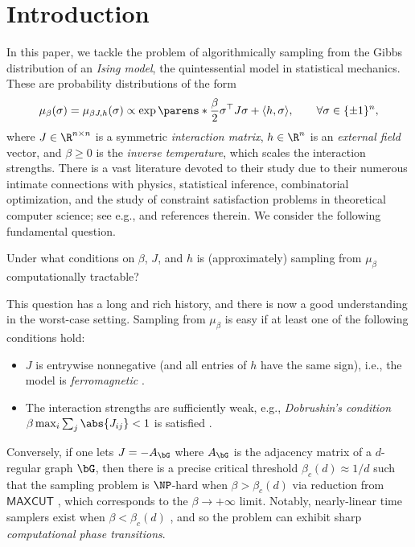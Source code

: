\documentclass[11pt,letterpaper]{article}
\begin{document}
\thispagestyle{empty}
\setcounter{page}{0}

\newpage




\section{Introduction}
In this paper, we tackle the problem of algorithmically sampling from the Gibbs distribution of an \emph{Ising model}, the quintessential model in statistical mechanics. These are probability distributions of the form
\begin{align*}
    \mu_{\beta}(\sigma) = \mu_{\beta J,h}(\sigma) \propto \exp\parens*{\frac{\beta}{2}\sigma^{\top} J \sigma + \langle h,\sigma\rangle}, \qquad \forall \sigma \in \{\pm1\}^{n},
\end{align*}
where $J \in \R^{n \times n}$ is a symmetric \emph{interaction matrix}, $h \in \R^{n}$ is an \emph{external field} vector, and $\beta \geq 0$ is the \emph{inverse temperature}, which scales the interaction strengths. There is a vast literature devoted to their study due to their numerous intimate connections with physics, statistical inference, combinatorial optimization, and the study of constraint satisfaction problems in theoretical computer science; see e.g., \cite{EKPS00, WJ08, MM09, Tal11, MNS15, FV17} and references therein. We consider the following fundamental question.

\begin{question*}
Under what conditions on $\beta$, $J$, and $h$ is (approximately) sampling from $\mu_{\beta}$ computationally tractable?
\end{question*}

This question has a long and rich history, and there is now a good understanding in the worst-case setting. Sampling from $\mu_{\beta}$ is easy if at least one of the following conditions hold:
\begin{itemize}
    \item $J$ is entrywise nonnegative (and all entries of $h$ have the same sign), i.e., the model is \emph{ferromagnetic} \cite{JS93}.
    \item The interaction strengths are sufficiently weak, e.g., \emph{Dobrushin's condition} $\beta \max_{i} \sum_{j} \abs{J_{ij}} < 1$ is satisfied \cite{Dob68,BD97}.
\end{itemize}
Conversely, if one lets $J = -A_{\bG}$ where $A_{\bG}$ is the adjacency matrix of a $d$-regular graph $\bG$, then there is a precise critical threshold $\beta_{c}(d) \approx 1/d$ such that the sampling problem is $\NP$-hard when $\beta > \beta_{c}(d)$ via reduction from $\mathsf{MAXCUT}$ \cite{SS12}, which corresponds to the $\beta \to +\infty$ limit. Notably, nearly-linear time samplers exist when $\beta < \beta_{c}(d)$ \cite{CLV21, AJKPV21b}, and so the problem can exhibit sharp \emph{computational phase transitions}.
\end{document}
